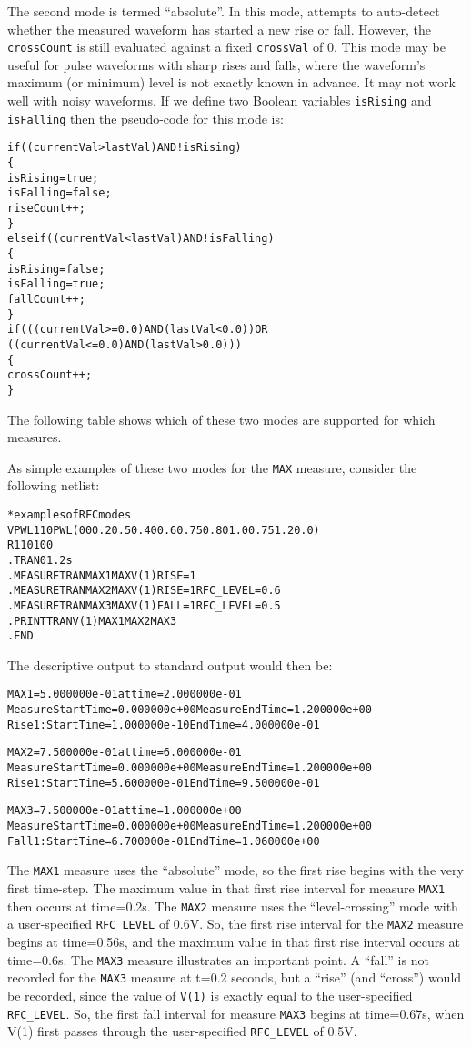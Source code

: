 The second mode is termed ``absolute''. In this mode, \Xyce{} attempts to 
auto-detect whether the measured waveform has started a new rise or fall. However,
the \texttt{crossCount} is still evaluated against a fixed \texttt{crossVal} of 0.
This mode may be useful for pulse waveforms with sharp rises and falls, where 
the waveform's maximum (or minimum) level is not exactly known in advance.  It 
may not work well with noisy waveforms.  If we define two Boolean variables 
\texttt{isRising} and \texttt{isFalling} then the pseudo-code for this mode is:
\begin{alltt}
if( (currentVal > lastVal) AND !isRising )
\{
  isRising= true;
  isFalling = false;
  riseCount++;
\}
else if( (currentVal < lastVal) AND !isFalling )
\{
  isRising = false;
  isFalling = true;
  fallCount++;
\}
if ( ( (currentVal >= 0.0) AND (lastVal < 0.0) ) OR
     ( (currentVal <= 0.0) AND (lastVal > 0.0) ) )
\{
  crossCount++;
\}
\end{alltt}
The following table shows which of these two modes are supported for which 
\Xyce{} measures.

As simple examples of these two modes for the \texttt{MAX} measure, consider 
the following netlist:
\begin{alltt}
*examples of RFC modes
VPWL1  1  0 PWL(0 0 0.2 0.5 0.4 0 0.6 0.75 0.8 0 1.0 0.75 1.2 0.0)
R1  1  0  100
.TRAN 0 1.2s
.MEASURE TRAN MAX1 MAX V(1) RISE=1
.MEASURE TRAN MAX2 MAX V(1) RISE=1 RFC_LEVEL=0.6
.MEASURE TRAN MAX3 MAX V(1) FALL=1 RFC_LEVEL=0.5
.PRINT TRAN V(1) MAX1 MAX2 MAX3
.END
\end{alltt}
The descriptive output to standard output would then be:
\begin{alltt}
MAX1 = 5.000000e-01 at time = 2.000000e-01
Measure Start Time= 0.000000e+00        Measure End Time= 1.200000e+00
Rise 1: Start Time= 1.000000e-10        End Time= 4.000000e-01

MAX2 = 7.500000e-01 at time = 6.000000e-01
Measure Start Time= 0.000000e+00        Measure End Time= 1.200000e+00
Rise 1: Start Time= 5.600000e-01        End Time= 9.500000e-01

MAX3 = 7.500000e-01 at time = 1.000000e+00
Measure Start Time= 0.000000e+00        Measure End Time= 1.200000e+00
Fall 1: Start Time= 6.700000e-01        End Time= 1.060000e+00
\end{alltt}
The \texttt{MAX1} measure uses the ``absolute'' mode, so the first rise begins with
the very first time-step.  The maximum value in that first rise interval for 
measure \texttt{MAX1} then occurs at time=0.2s.  The \texttt{MAX2} measure uses 
the ``level-crossing'' mode with a user-specified \texttt{RFC\_LEVEL} of 0.6V.  So, 
the first rise interval for the \texttt{MAX2} measure begins at time=0.56s, and 
the maximum value in that first rise interval occurs at time=0.6s.  The
\texttt{MAX3} measure illustrates an important point.  A ``fall'' is not recorded
for the \texttt{MAX3} measure at t=0.2 seconds, but a ``rise'' (and ``cross'') 
would be recorded, since the value of \texttt{V(1)} is exactly equal to the
user-specified \texttt{RFC\_LEVEL}. So, the first fall interval for measure 
\texttt{MAX3} begins at time=0.67s, when V(1) first passes through the 
user-specified \texttt{RFC\_LEVEL} of 0.5V.


